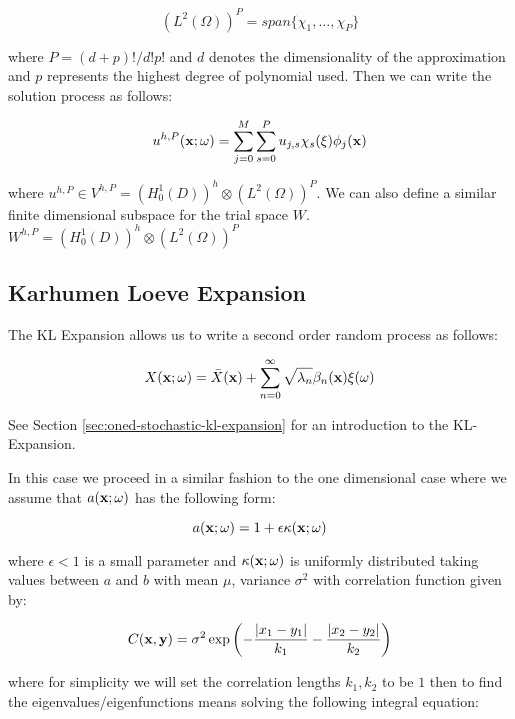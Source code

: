 \begin{equation}
    (L^2(\Omega))^P = span\{\chi_1,\ldots,\chi_P\}
\end{equation}

where $P = (d + p)!/d!p!$ and $d$ denotes the dimensionality of the
approximation and $p$ represents the highest degree of polynomial used. Then we
can write the solution process as follows:

\begin{equation}\label{eq:twod-stochastic-uhp}
    u^{h,P}(\mathbf{x};\omega) = \sum_{j=0}^M\sum_{s=0}^Pu_{j,s}
        \chi_s(\xi)\phi_j(\mathbf{x})
\end{equation}

where $u^{h,P} \in V^{h,P} = (H^1_0(D))^h \otimes (L^2(\Omega))^P$. We can also
define a similar finite dimensional subspace for the trial space $W$.
$W^{h,P} = (H^1_0(D))^h \otimes (L^2(\Omega))^P$


\subsection{Karhumen Loeve Expansion}

The KL Expansion allows us to write a second order random process as follows:

\begin{equation}
    X(\mathbf{x};\omega) = \bar{X}(\mathbf{x}) +
        \sum_{n=0}^\infty\sqrt{\lambda_n}\beta_n(\mathbf{x})\xi(\omega)
\end{equation}

See Section \ref{sec:oned-stochastic-kl-expansion} for an introduction to the
KL-Expansion.

In this case we proceed in a similar fashion to the one dimensional case where
we assume that $a(\mathbf{x};\omega)$ has the following form:

\begin{equation}
    a(\mathbf{x};\omega) = 1 + \epsilon\kappa(\mathbf{x};\omega)
\end{equation}

where $\epsilon < 1$ is a small parameter and $\kappa(\mathbf{x};\omega)$ is
uniformly distributed taking values between $a$ and $b$ with mean $\mu$,
variance $\sigma^2$ with correlation function given by:

\begin{equation}
    C(\mathbf{x}, \mathbf{y}) =
        \sigma^2\exp{\left(-\frac{|x_1 - y_1|}{k_1} - \frac{|x_2 - y_2|}{k_2}\right)}
\end{equation}

where for simplicity we will set the correlation lengths $k_1, k_2$ to be $1$
then to find the eigenvalues/eigenfunctions means solving the following
integral equation:

